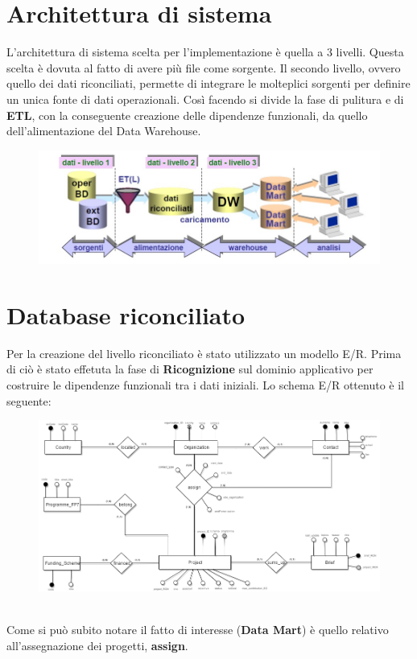\documentclass[12pt,a4paper]{report}
\begin{document}
\section*{Architettura di sistema}
L'architettura di sistema scelta per l'implementazione è quella a 3 livelli. Questa scelta è dovuta al fatto di avere più file come sorgente. Il secondo livello, ovvero quello dei dati riconciliati, permette di integrare le molteplici sorgenti per definire un unica fonte di dati operazionali. Così facendo si divide la fase di pulitura e di \textbf{ETL}, con la conseguente creazione delle dipendenze funzionali, da quello dell'alimentazione del Data Warehouse.
\begin{figure}[htbp]
	\centering
	\includegraphics[scale=0.6]{architettura}
\end{figure}
\section*{Database riconciliato}
Per la creazione del livello riconciliato è stato utilizzato un modello E/R. Prima di ciò è stato effetuta la fase di \textbf{Ricognizione} sul dominio applicativo per costruire le dipendenze funzionali tra i dati iniziali. Lo schema E/R ottenuto è il seguente:\\
\begin{figure}[htbp]
	\centering
	\includegraphics[scale=0.50]{reconciled}
\end{figure}
\\Come si può subito notare il fatto di interesse (\textbf{Data Mart}) è quello relativo all'assegnazione dei progetti, \textbf{assign}.
\end{document}
